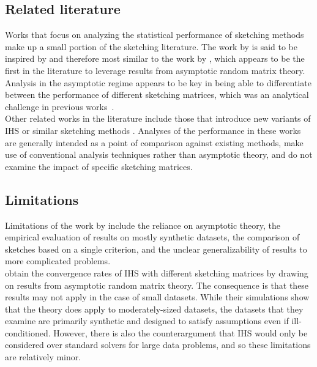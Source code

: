 \subsection{Related literature}

Works that focus on analyzing the statistical performance of sketching methods make up a small portion of the sketching literature. The work by \citet{Lacotte:2020} is said to be inspired by and therefore most similar to the work by \citet{Dobriban:2019}, which appears to be the first in the literature to leverage results from asymptotic random matrix theory. Analysis in the asymptotic regime appears to be key in being able to differentiate between the performance of different sketching matrices, which was an analytical challenge in previous works~\citep{Choromanski:2017,Pilanci:2016,Raskutti:2016}.
\\

Other related works in the literature include those that introduce new variants of IHS or similar sketching methods \todo. Analyses of the performance in these works are generally intended as a point of comparison against existing methods, make use of conventional analysis techniques rather than asymptotic theory, and do not examine the impact of specific sketching matrices.

\subsection{Limitations}

Limitations of the work by \citet{Lacotte:2020} include the reliance on asymptotic theory, the empirical evaluation of results on mostly synthetic datasets, the comparison of sketches based on a single criterion, and the unclear generalizability of results to more complicated problems.
\\

\citet{Lacotte:2020} obtain the convergence rates of IHS with different sketching matrices by drawing on results from asymptotic random matrix theory. The consequence is that these results may not apply in the case of small datasets. While their simulations show that the theory does apply to moderately-sized datasets, the datasets that they examine are primarily synthetic and designed to satisfy assumptions even if ill-conditioned. However, there is also the counterargument that IHS would only be considered over standard solvers for large data problems, and so these limitations are relatively minor.
\\

